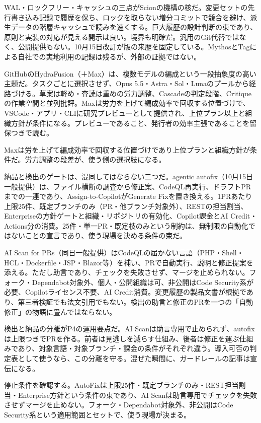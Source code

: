 \documentclass[lualatex,a4paper,10pt]{jlreq}
\begin{document}
WAL・ロックフリー・キャッシュの三点がScionの機構の核だ。変更セットの先行書き込み記録で履歴を保ち、ロックを取らない増分コミットで競合を避け、派生データの階層キャッシュで読みを速くする。巨大履歴の設計判断の束であり、原則と実装の対応が見える開示は良い。境界も明確だ。汎用のGit代替ではなく、公開提供もない。10月15日改訂が版の来歴を固定している。MythosとTagによる自社での実地利用の記録は残るが、外部の証拠ではない。
\cite{B32}


GitHubのHydraFusion（＋Max）は、複数モデルの編成という一段抽象度の高い主題だ。タスクごとに選択させず、Opus 5.5・Astra・Sol・Lunaのプールから経路づける。草案は軽め・査読は重めの労力調整、Cascadeの判定段階、Critiqueの作業空間と並列批評。Maxは労力を上げて編成効率で回収する位置づけで、VSCode・アプリ・CLIに研究プレビューとして提供され、上位プラン以上と組織方針が条件になる。プレビューであること、発行者の効率主張であることを留保つきで読む。
\cite{B33}


Maxは労を上げて編成効率で回収する位置づけであり上位プランと組織方針が条件だ。労力調整の段差が、使う側の選択肢になる。
\cite{B33}


納品と検出のゲートは、混同してはならない二つだ。agentic autofix（10月15日一般提供）は、ファイル横断の調査から修正案、CodeQL再実行、ドラフトPRまでの一連であり、Assign-to-CopilotがGenerate Fixを置き換える。1PRあたり上限25件、既定ブランチのみ（PR・他ブランチ対象外）、RESTの担当割当、Enterpriseの方針ゲートと組織・リポジトリの有効化、Copilot課金とAI Credit・Actions分の消費。25件・単一PR・既定枝のみという制約は、無制限の自動化ではないことの宣言であり、使う現場を決める条件の束だ。
\cite{B34}


AI Scan for PRs（同日一般提供）はCodeQLの届かない言語（PHP・Shell・HCL・Dockerfile・JSP・Blazor等）を補い、PRで自動実行、説明と修正提案を添える。ただし助言であり、チェックを失敗させず、マージを止められない。フォーク・Dependabot対象外、個人・公開組織は可、非公開はCode Security系が必要、Copilotライセンス不要、AI Credit消費。変更履歴の製品文書が根拠であり、第三者検証でも法文引用でもない。検出の助言と修正のPRを一つの「自動修正」の物語に畳んではならない。
\cite{B35}


検出と納品の分離がP4の運用要点だ。AI Scanは助言専用で止められず、autofixは上限つきでPRを作る。前者は見逃しを減らす仕組み、後者は修正を運ぶ仕組みであり、対象言語・対象ブランチ・課金の条件がそれぞれ違う。導入可否の判定表として使うなら、この分離を守る。混ぜた瞬間に、ガードレールの記事は宣伝になる。
\cite{B34,B35}


停止条件を確認する。AutoFixは上限25件・既定ブランチのみ・REST担当割当・Enterprise方針という条件の束であり、AI Scanは助言専用でチェックを失敗させずマージを止めない。フォーク・Dependabot対象外、非公開はCode Security系という適用範囲とセットで、使う現場が決まる。
\cite{B34,B35}
\end{document}
